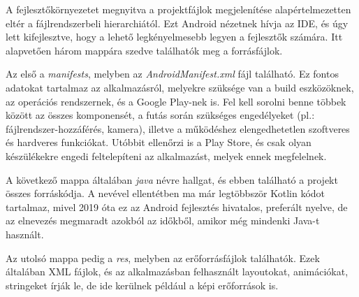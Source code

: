 A fejlesztőkörnyezetet megnyitva a projektfájlok megjelenítése alapértelmezetten eltér a fájlrendszerbeli hierarchiától. Ezt Android nézetnek hívja az IDE, és úgy lett kifejlesztve, hogy a lehető legkényelmesebb legyen a fejlesztők számára. Itt alapvetően három mappára szedve találhatók meg a forrásfájlok.

Az első a \emph{manifests}, melyben az \emph{AndroidManifest.xml} fájl található. Ez fontos adatokat tartalmaz az alkalmazásról, melyekre szüksége van a build eszközöknek, az operációs rendszernek, és a Google Play-nek is. Fel kell sorolni benne többek között az összes komponensét, a futás során szükséges engedélyeket (pl.: fájlrendszer-hozzáférés, kamera), illetve a működéshez elengedhetetlen szoftveres és hardveres funkciókat. Utóbbit ellenőrzi is a Play Store, és csak olyan készülékekre engedi feltelepíteni az alkalmazást, melyek ennek megfelelnek. \cite{Manifest}

A következő mappa általában \emph{java} névre hallgat, és ebben található a projekt összes forráskódja. A nevével ellentétben ma már legtöbbször Kotlin kódot tartalmaz, mivel 2019 óta ez az Android fejlesztés hivatalos, preferált nyelve, de az elnevezés megmaradt azokból az időkből, amikor még mindenki Java-t használt.

Az utolsó mappa pedig a \emph{res}, melyben az erőforrásfájlok találhatók. Ezek általában XML fájlok, és az alkalmazásban felhasznált layoutokat, animációkat, stringeket írják le, de ide kerülnek például a képi erőforrások is.
